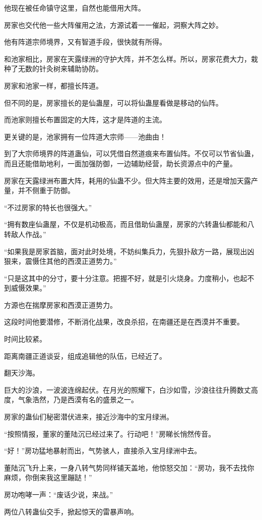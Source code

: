 \begin{this_body}
他现在被任命镇守这里，自然也能借用大阵。

房家也交代他一些大阵催用之法，方源试着一一催起，洞察大阵之妙。

他有阵道宗师境界，又有智道手段，很快就有所得。

和池家相比，房家在天露绿洲的守护大阵，并不怎么样。所以，房家花费大力，栽种了无数的针灸树来辅助协防。

房家和池家一样，都擅长阵道。

但不同的是，房家擅长的是仙蛊屋，可以将仙蛊屋看做是移动的仙阵。

而池家则擅长布置固定的大阵，这才是阵道的主流。

更关键的是，池家拥有一位阵道大宗师——池曲由！

到了大宗师境界的阵道蛊仙，可以凭借自然道痕来布置仙阵。不仅可以节省仙蛊，而且还能借助地利，一面加强防御，一边辅助经营，助长资源点中的产量。

房家在天露绿洲布置大阵，耗用的仙蛊不少。但大阵主要的效用，还是增加天露产量，并不侧重于防御。

“不过房家的特长也很强大。”

“拥有数座仙蛊屋，不仅是机动极高，而且借助仙蛊屋，房家的六转蛊仙都能和八转敌人作战。”

“如果我是房家首脑，面对此时处境，不妨纠集兵力，先狠扑敌方一路，展现出凶狠来，震慑住其他的西漠正道势力。”

“只是这其中的分寸，要十分注意。把握不好，就是引火烧身。力度稍小，也起不到威慑效果。”

方源也在揣摩房家和西漠正道势力。

这段时间他要潜修，不断消化战果，改良杀招，在南疆还是在西漠并不重要。

时间比较紧。

距离南疆正道谈妥，组成追辑他的队伍，已经近了。

翻天沙海。

巨大的沙浪，一波波连绵起伏。在月光的照耀下，白沙如雪，沙浪往往升腾数丈高度，气象浩然，乃是西漠有名的盛景之一。

房家的蛊仙们秘密潜伏进来，接近沙海中的宝月绿洲。

“按照情报，董家的董陆沉已经过来了。行动吧！”房睇长悄然传音。

“好！”房功猛地暴射而出，气势骇人，直接杀入宝月绿洲中去。

董陆沉飞升上来，一身八转气势同样铺天盖地，他惊怒交加：“房功，我不去找你麻烦，你倒来我这里蹦跶！”

房功咆哮一声：“废话少说，来战。”

两位八转蛊仙交手，掀起惊天的雷暴声响。


\end{this_body}
